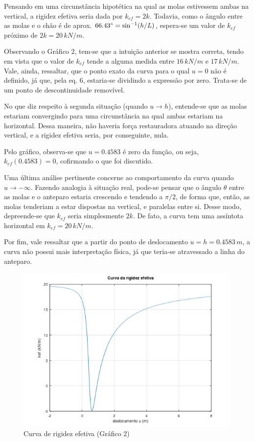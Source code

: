 \documentclass[a4paper, 12pt]{article}
\begin{document}
	Pensando em uma circunstância hipotética na qual
	as molas estivessem ambas na vertical, a rigidez efetiva seria dada por $k_{ef}=2k$. Todavia, como o ângulo entre as 
	molas e o chão é de aprox. $66.43\degree =\sin ^{-1}(h/L)$, espera-se um valor de $k_{ef}$ próximo de $2k=20\,kN/m$.
	
	Observando o Gráfico 2, tem-se que a intuição anterior se mostra correta, tendo em vista que o valor de $k_{ef}$ tende
	a alguma medida entre $16\,kN/m$ e $17\,kN/m$. Vale, ainda, ressaltar, que o ponto exato da curva para o qual $u=0$ não
	é definido, já que, pela eq. 6, estaria-se dividindo a expressão por zero. Trata-se de um ponto de descontinuidade 
	removível.
	
	No que diz respeito à segunda situação (quando $u\rightarrow h$), entende-se que as molas estariam convergindo para uma
	circunstância na qual ambas estariam na horizontal. Dessa maneira, não haveria força restauradora atuando na direção
	vertical, e a rigidez efetiva seria, por conseguinte, nula.	
	
	Pelo gráfico, observa-se que $u=0.4583$ é zero da função, ou seja, $k_{ef}(0.4583)=0$, cofirmando o que foi discutido.
	
	Uma última análise pertinente concerne ao comportamento da curva quando $u\rightarrow -\infty$. Fazendo analogia à 
	situação real, pode-se pensar que o ângulo $\theta$ entre as molas e o anteparo estaria crescendo e tendendo a $\pi /2$,
	de forma que, então, as molas tenderiam a estar dispostas na vertical, e paralelas entre si. Desse modo, depreende-se 
	que $k_{ef}$ seria simplesmente $2k$. De fato, a curva tem uma assíntota horizontal em $k_{ef}=20\,kN/m$.
	
	Por fim, vale ressaltar que a partir do ponto de deslocamento $u=h=0.4583\,m$, a curva não possui mais interpretação
	física, já que teria-se atravessado a linha do anteparo.
	
	\begin{figure}[!htb]
		\centering
		\includegraphics[scale=1]{g2.png}
		\caption{Curva de rigidez efetiva (Gráfico 2)}
	\end{figure}
	
\end{document}
